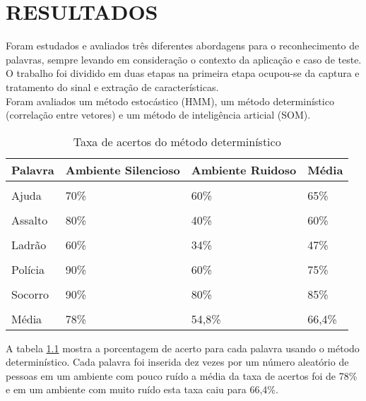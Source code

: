 \chapter{RESULTADOS}
\thispagestyle{plain}
\label{chap:anal}

\quad Foram estudados e avaliados três diferentes abordagens para o reconhecimento de palavras, sempre levando em consideração o contexto da aplicação e caso de teste. 
O trabalho foi dividido em duas etapas na primeira etapa ocupou-se da captura e tratamento do sinal e extração de características. \\

\quad Foram avaliados um método estocástico (HMM), um método determinístico (correlação entre vetores) e um método de inteligência articial (SOM). 
\begin{table}[H]
\centering
\caption{Taxa de acertos do método determinístico}
\label{tab:comp}
\smallskip
\begin{tabular}{|l|l|l|l|}
\hline
 Palavra & Ambiente Silencioso & Ambiente Ruidoso & Média\\[0.5ex]
\hline
&&&\\[-2ex]
Ajuda & 70\% &  60\% &  65\%\\[0.5ex]
\hline
&&&\\[-2ex]
Assalto & 80\% &  40\% &  60\% \\[0.5ex]
\hline
&&&\\[-2ex]
Ladrão & 60\% & 34\% & 47\%\\[0.5ex]
\hline
&&&\\[-2ex]
Polícia & 90\% & 60\% & 75\%\\[0.5ex]
\hline
&&&\\[-2ex]
Socorro & 90\% & 80\% & 85\%\\[0.5ex]
\hline
&&&\\[-2ex]
Média & 78\% & 54,8\% & 66,4\%\\[0.5ex]
\hline
\end{tabular}
\end{table}

A tabela \ref{tab:comp} mostra a porcentagem de acerto para cada palavra usando o método determinístico. Cada palavra foi inserida dez vezes por um número aleatório de pessoas  em um ambiente com pouco ruído a média da taxa de acertos foi de 78\% e em um ambiente com muito ruído esta taxa caiu para 66,4\%.

